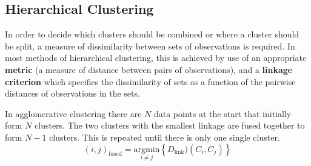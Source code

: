 \documentclass[11pt]{article}
\theoremstyle{definition}
\begin{document}
\subsection{Hierarchical Clustering}
In order to decide which clusters should be combined or where a cluster should be split, a measure of dissimilarity between sets of observations is required. In most methods of hierarchical clustering, this is achieved by use of an appropriate \textbf{metric} (a measure of distance between pairs of observations), and a \textbf{linkage criterion} which specifies the dissimilarity of sets as a function of the pairwise distances of observations in the sets.

In agglomerative clustering there are $N$ data points at the start that initially form $N$ clusters. The two clusters with the smallest linkage are fused together to form $N-1$ clusters. This is repeated until there is only one single cluster.
\begin{equation*}
	(i,j)_{\text{fused}} = \underset{i\neq j}{\text{argmin}} \left\{ D_{\text{link}})(C_i,C_j) \right\}
\end{equation*}
\end{document}
